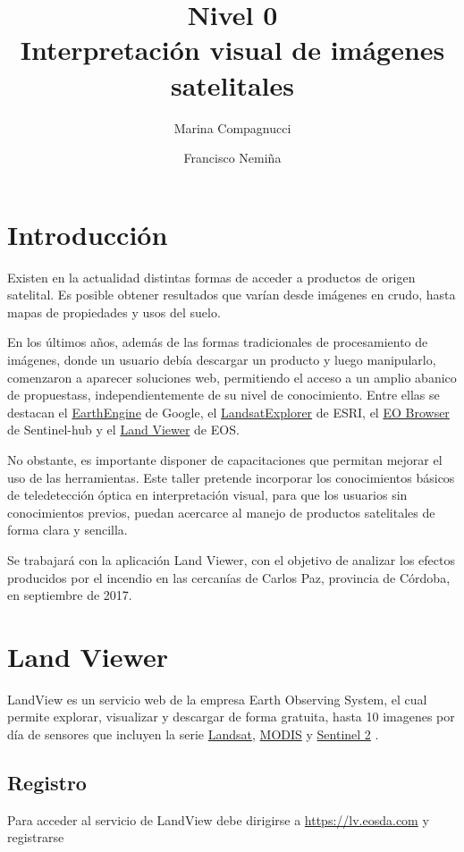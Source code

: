 \documentclass[a4paper,12pt]{book}
\title{{\large Nivel 0} \\ Interpretación visual de imágenes satelitales}
\author{Marina Compagnucci \and Francisco Nemiña}
\begin{document}
\maketitle
\titlepage

\chapter{Introducción}
Existen en la actualidad distintas formas de acceder a productos de origen satelital. Es posible obtener resultados que varían desde imágenes en crudo, hasta mapas de propiedades y usos del suelo.

En los últimos años, además de las formas tradicionales de procesamiento de imágenes, donde un usuario debía descargar un producto y luego manipularlo, comenzaron a aparecer soluciones web, permitiendo el acceso a un amplio abanico de propuestass, independientemente de su nivel de conocimiento. Entre ellas se destacan el \href{https://explorer.earthengine.google.com/#workspace}{EarthEngine} de Google, el \href{http://landsatexplorer.esri.com/}{LandsatExplorer} de ESRI, el \href{http://apps.sentinel-hub.com/eo-browser/}{EO Browser} de Sentinel-hub y el \href{lv.eosda.com}{Land Viewer} de EOS.

No obstante, es importante disponer de capacitaciones que permitan mejorar el uso de las herramientas. Este taller pretende incorporar los conocimientos básicos de teledetección óptica en interpretación visual, para que los usuarios sin conocimientos previos, puedan acercarce al manejo de productos satelitales de forma clara y sencilla.

Se trabajará con la aplicación Land Viewer, con el objetivo de analizar los efectos producidos por el incendio en las cercanías de Carlos Paz, provincia de Córdoba, en septiembre de 2017.

\chapter{Land Viewer}

LandView es un servicio web de la empresa Earth Observing System, el cual permite explorar, visualizar y descargar de forma gratuita, hasta 10 imagenes por día de sensores que incluyen la serie \href{https://landsat.usgs.gov/}{Landsat}, \href{https://lpdaac.usgs.gov/dataset_discovery/modis/modis_products_table/mcd43a4}{MODIS} y \href{https://sentinel.esa.int/web/sentinel/missions/sentinel-2}{Sentinel 2} .

\section{Registro}
Para acceder al servicio de LandView debe dirigirse a \url{https://lv.eosda.com} y registrarse
\end{document}
